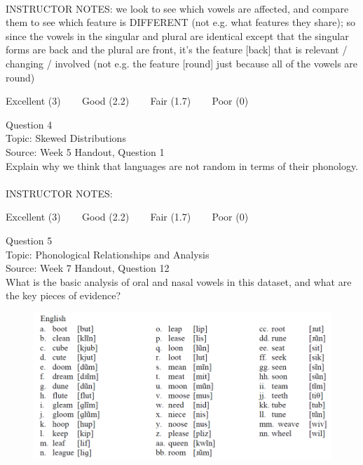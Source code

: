 \documentclass[12pt]{article}
\begin{document}
~\\
INSTRUCTOR NOTES: we look to see which vowels are affected, and compare them to see which feature is DIFFERENT (not e.g. what features they share); so since the vowels in the singular and plural are identical except that the singular forms are back and the plural are front, it's the feature [back] that is relevant / changing / involved (not e.g. the feature [round] just because all of the vowels are round)


\vfill
Excellent (3) ~~~ Good (2.2) ~~~ Fair (1.7) ~~~ Poor (0)
\newpage

{\large Question 4}\\

Topic: Skewed Distributions\\
Source: Week 5 Handout, Question 1\\

Explain why we think that languages are not random in terms of their phonology.\\


~\\
INSTRUCTOR NOTES: 


\vfill
Excellent (3) ~~~ Good (2.2) ~~~ Fair (1.7) ~~~ Poor (0)
\newpage

{\large Question 5}\\

Topic: Phonological Relationships and Analysis\\
Source: Week 7 Handout, Question 12\\

What is the basic analysis of oral and nasal vowels in this dataset, and what are the key pieces of evidence?\\

\begin{figure}[H]
\includegraphics{../images/english12.png}
\end{figure}
\end{document}
